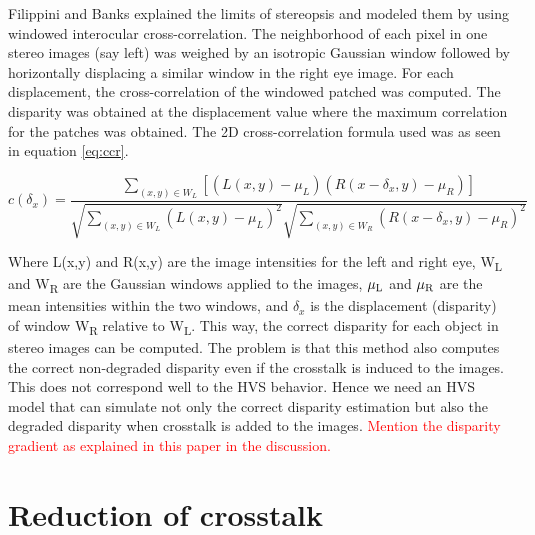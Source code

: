Filippini and Banks \cite{filippini2009limits} explained the limits of stereopsis and modeled them by using windowed interocular cross-correlation. The neighborhood of each pixel in one stereo images (say left) was weighed by an isotropic Gaussian window followed by horizontally displacing a similar window in the right eye image. For each displacement, the cross-correlation of the windowed patched was computed. The disparity was obtained at the displacement value where the maximum correlation for the patches was obtained. The 2D cross-correlation formula used was as seen in equation \ref{eq:ccr}.

\begin{equation}
c(\delta_x) = \frac{ \sum\limits_{(x,y) \in W_L} [(L(x,y) - \mu_L)(R(x-\delta_x, y) - \mu_R)] }{\sqrt{\sum\limits_{(x,y) \in W_L}(L(x,y) - \mu_L)^2} \sqrt{\sum\limits_{(x,y) \in W_R}(R(x-\delta_x, y)- \mu_R)^2}}
\label{eq:ccr}
\end{equation}

Where L(x,y) and R(x,y) are the image intensities for the left and right eye, W\textsubscript{L} and W\textsubscript{R} are the Gaussian windows applied to the images, $\mu\textsubscript{L}$ and $\mu\textsubscript{R}$ are the mean intensities within the two windows, and $\delta_x$ is the displacement (disparity) of window W\textsubscript{R} relative to W\textsubscript{L}. This way, the correct disparity for each object in stereo images can be computed. The problem is that this method also computes the correct non-degraded disparity even if the crosstalk is induced to the images. This does not correspond well to the HVS behavior. Hence we need an HVS model that can simulate not only the correct disparity estimation but also the degraded disparity when crosstalk is added to the images. \textcolor{red}{Mention the disparity gradient as explained in this paper in the discussion.}

\section{Reduction of crosstalk}

